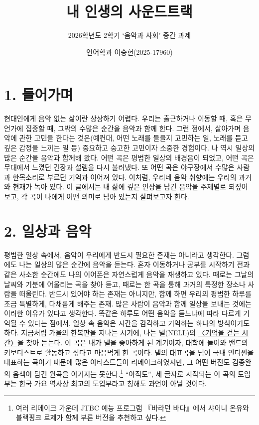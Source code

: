 \documentclass{article}
\let\plainhref\href
\renewcommand{\href}[2]{\plainhref{#1}{\underline{#2}}}
\begin{document}
\title{내 인생의 사운드트랙}
\author{2026학년도 2학기 `음악과 사회' 중간 과제}
\date{언어학과 이승헌(2025-17960)}

\setcounter{secnumdepth}{0}
\bigskip

\maketitle
\thispagestyle{fancy}

\section{1. 들어가며}

\indent 현대인에게 음악 없는 삶이란 상상하기 어렵다. 우리는 출근하거나 이동할 때, 혹은 무언가에 집중할 때, 그밖의 수많은 순간을 음악과 함께 한다. 그런 점에서, 살아가며 음악에 관한 고민을 한다는 것은(예컨대, 어떤 노래를 들을지 고민하는 일, 노래를 듣고 깊은 감정을 느끼는 일 등) 중요하고 숭고한 고민이자 소중한 경험이다. 나 역시 일상의 많은 순간을 음악과 함께해 왔다. 어떤 곡은 평범한 일상의 배경음이 되었고, 어떤 곡은 무대에서 느꼈던 긴장과 설렘을 다시 불러냈다. 또 어떤 곡은 야구장에서 수많은 사람과 한목소리로 부르던 기억과 이어져 있다. 이처럼, 우리네 음악 취향에는 우리의 과거와 현재가 녹아 있다. 이 글에서는 내 삶에 깊은 인상을 남긴 음악을 주제별로 되짚어 보고, 각 곡이 나에게 어떤 의미로 남아 있는지 살펴보고자 한다.

\section{2. 일상과 음악}
\label{sec.2}

\indent 평범한 일상 속에서, 음악이 우리에게 반드시 필요한 존재는 아니라고 생각한다. 그럼에도 나는 일상의 많은 순간에 음악을 듣는다. 혼자 이동하거나 공부를 시작하기 전과 같은 사소한 순간에도 나의 이어폰은 자연스럽게 음악을 재생하고 있다. 때로는 그날의 날씨와 기분에 어울리는 곡을 찾아 듣고, 때로는 한 곡을 통해 과거의 특정한 장소나 사람을 떠올린다. 반드시 있어야 하는 존재는 아니지만, 함께 하면 우리의 평범한 하루를 조금 특별하게, 다채롭게 해주는 존재. 많은 사람이 음악과 함께 일상을 보내는 것에는 이러한 이유가 있다고 생각한다. 똑같은 하루도 어떤 음악을 듣느냐에 따라 다르게 기억될 수 있다는 점에서, 일상 속 음악은 시간을 감각하고 기억하는 하나의 방식이기도 하다. 지금처럼 가을의 한복판을 지나는 시기에, 나는 넬(NELL)의 \href{https://youtu.be/0bTCIbyvBBc?si=3X3nqA629AnmnH9n}{〈기억을 걷는 시간〉}을 찾아 듣는다. 이 곡은 내가 넬을 좋아하게 된 계기이자, 대학에 들어와 밴드의 키보디스트로 활동하고 싶다고 마음먹게 한 곡이다. 넬의 대표곡을 넘어 국내 인디씬을 대표하는 곡이기 때문에 많은 아티스트들이 리메이크하였지만, 그 어떤 버전도 김종완의 음색이 담긴 원곡을 이기지는 못한다.\footnote{여러 리메이크 가운데 JTBC 예능 프로그램 『바라던 바다』에서 샤이니 온유와 블랙핑크 로제가 함께 부른 버전을 추천하고 싶다.} ``아직도'', 세 글자로 시작되는 이 곡의 도입부는 한국 가요 역사상 최고의 도입부라고 칭해도 과언이 아닐 것이다.   
\medskip
\end{document}
